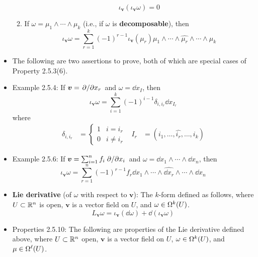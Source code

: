\documentclass[../notes.tex]{subfiles}
\begin{document}
\begin{itemize}
\begin{enumerate}
\begin{equation*}
            \iota_{\bm{v}}(\iota_{\bm{v}}\omega) = 0
        \end{equation*}
        \item If $\omega=\mu_1\wedge\cdots\wedge\mu_k$ (i.e., if $\omega$ is \textbf{decomposable}), then
        \begin{equation*}
            \iota_{\bm{v}}\omega = \sum_{r=1}^k(-1)^{r-1}\iota_{\bm{v}}(\mu_r)\mu_1\wedge\cdots\wedge\widehat{\mu_r}\wedge\cdots\wedge\mu_k
        \end{equation*}
    \end{enumerate}
    \item The following are two assertions to prove, both of which are special cases of Property 2.5.3(6).
    \item Example 2.5.4: If $\bm{v}=\pdv*{x_r}$ and $\omega=\dd{x_I}$, then
    \begin{equation*}
        \iota_{\bm{v}}\omega = \sum_{i=1}^k(-1)^{i-1}\delta_{i,i_r}\dd{x_{I_r}}
    \end{equation*}
    where
    \begin{align*}
        \delta_{i,i_r} &=
        \begin{cases}
            1 & i = i_r\\
            0 & i \neq i_r
        \end{cases}&
        I_r &= (i_1,\dots,\widehat{i_r},\dots,i_k)
    \end{align*}
    \item Example 2.5.6: If $\bm{v}=\sum_{i=1}^nf_i\pdv*{x_i}$ and $\omega=\dd{x_1}\wedge\cdots\wedge\dd{x_n}$, then
    \begin{equation*}
        \iota_{\bm{v}}\omega=\sum_{r=1}^n(-1)^{r-1}f_r\dd{x_1}\wedge\cdots\wedge\widehat{\dd{x_r}}\wedge\cdots\wedge\dd{x_n}
    \end{equation*}
    \item \textbf{Lie derivative} (of $\omega$ with respect to $\bm{v}$): The $k$-form defined as follows, where $U\subset\R^n$ is open, $\bm{v}$ is a vector field on $U$, and $\omega\in\ome[k]{U}$.
    \begin{equation*}
        L_{\bm{v}}\omega = \iota_{\bm{v}}(\dd\omega)+\dd(\iota_{\bm{v}}\omega)
    \end{equation*}
    \item Properties 2.5.10: The following are properties of the Lie derivative defined above, where $U\subset\R^n$ open, $\bm{v}$ is a vector field on $U$, $\omega\in\ome[k]{U}$, and $\mu\in\ome[\ell]{U}$.
    \begin{enumerate}

\end{enumerate}
\end{itemize}
\end{document}
